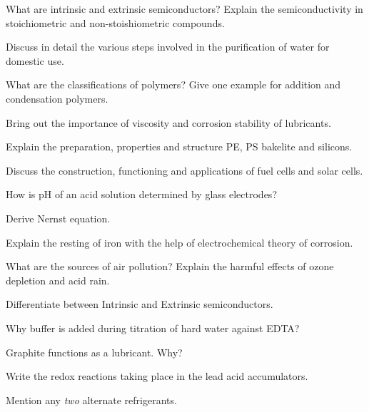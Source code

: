 \item \iitem What are intrinsic and extrinsic semiconductors? Explain the
  semiconductivity in stoichiometric and non-stoishiometric compounds.

\newpage \again

\Or
\item Discuss in detail the various steps involved in the purification of
  water for domestic use.
\ene

\item \iitem \iitem What are the classifications of polymers? Give one
  example for addition and condensation polymers. 
\item Bring out the importance of viscosity and corrosion stability
  of lubricants. 
\ene
\Or
\item Explain the preparation, properties and structure PE, PS bakelite and
  silicons.
\ene

\item \iitem Discuss the construction, functioning and applications of fuel
  cells and solar cells.
\Or
\item \iitem How is pH of an acid solution determined by glass electrodes?
\item Derive Nernst equation. 
\ene
\ene

\item \iitem Explain the resting of iron with the help of electrochemical
  theory of corrosion.
\Or
\item What are the sources of air pollution? Explain the harmful effects of
  ozone depletion and acid rain.
\ene

\markC
\ene

\newpage

\sub{\subj}
\maxtime

\partA

\iitem Differentiate between Intrinsic and Extrinsic semiconductors.
\item Why buffer is added during titration of hard water against EDTA?
\item Graphite functions as a lubricant. Why?
\item Write the redox reactions taking place in the lead acid accumulators.
\item Mention any {\em two} alternate refrigerants.

\markA
\partB

